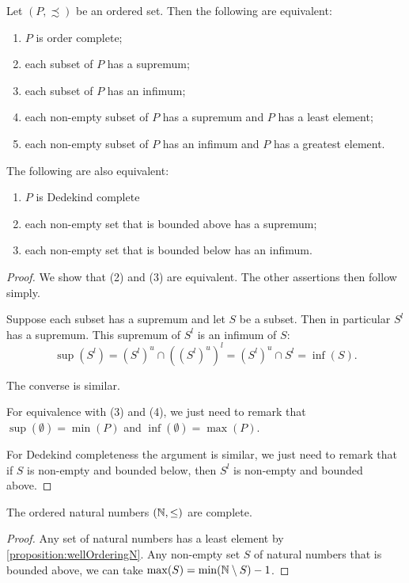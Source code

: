 \begin{proposition} \label{existenceSupremaInfima}
Let $(P,\precsim)$ be an ordered set. Then the following are equivalent:
\begin{enumerate}
\item $P$ is order complete;
\item each subset of $P$ has a supremum;
\item each subset of $P$ has an infimum;
\item each non-empty subset of $P$ has a supremum and $P$ has a least element;
\item each non-empty subset of $P$ has an infimum and $P$ has a greatest element.
\end{enumerate}
The following are also equivalent:
\begin{enumerate}
\item $P$ is Dedekind complete
\item each non-empty set that is bounded above has a supremum;
\item each non-empty set that is bounded below has an infimum.
\end{enumerate}
\end{proposition}
\begin{proof}
We show that (2) and (3) are equivalent. The other assertions then follow simply.

Suppose each subset has a supremum and let $S$ be a subset. Then in particular $S^l$ has a supremum. This supremum of $S^l$ is an infimum of $S$:
\[ \sup(S^l) = (S^l)^u\cap((S^l)^u)^l = (S^l)^u\cap S^l = \inf(S).  \]

The converse is similar.

For equivalence with (3) and (4), we just need to remark that $\sup(\emptyset) = \min(P)$ and $\inf(\emptyset) = \max(P)$.

For Dedekind completeness the argument is similar, we just need to remark that if $S$ is non-empty and bounded below, then $S^l$ is non-empty and bounded above.
\end{proof}


\begin{lemma}
The ordered natural numbers $\left( \mathbb{N},\leq \right)$ are complete.
\end{lemma}
\begin{proof}
Any set of natural numbers has a least element by \ref{proposition:wellOrderingN}. Any non-empty set $S$ of natural numbers that is bounded above, we can take $\max(S) = \min(\mathbb{N}\setminus S)-1$.
\end{proof}

